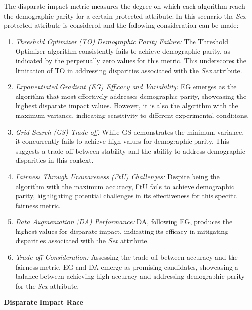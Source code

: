 The disparate impact metric measures the degree on which each algorithm reach the demographic parity for a certain protected attribute. In this scenario the \emph{Sex} protected attribute is considered and the following consideration can be made:

\begin{enumerate}
    \item \emph{Threshold Optimizer (TO) Demographic Parity Failure:} The Threshold Optimizer algorithm consistently fails to achieve demographic parity, as indicated by the perpetually zero values for this metric. This underscores the limitation of TO in addressing disparities associated with the \emph{Sex} attribute.

    \item \emph{Exponentiated Gradient (EG) Efficacy and Variability:} EG emerges as the algorithm that most effectively addresses demographic parity, showcasing the highest disparate impact values. However, it is also the algorithm with the maximum variance, indicating sensitivity to different experimental conditions.

    \item \emph{Grid Search (GS) Trade-off:} While GS demonstrates the minimum variance, it concurrently fails to achieve high values for demographic parity. This suggests a trade-off between stability and the ability to address demographic disparities in this context.

    \item \emph{Fairness Through Unawareness (FtU) Challenges:} Despite being the algorithm with the maximum accuracy, FtU fails to achieve demographic parity, highlighting potential challenges in its effectiveness for this specific fairness metric.

    \item \emph{Data Augmentation (DA) Performance:} DA, following EG, produces the highest values for disparate impact, indicating its efficacy in mitigating disparities associated with the \emph{Sex} attribute.

    \item \emph{Trade-off Consideration:} Assessing the trade-off between accuracy and the fairness metric, EG and DA emerge as promising candidates, showcasing a balance between achieving high accuracy and addressing demographic parity for the \emph{Sex} attribute.
\end{enumerate}
\newpage
\textbf{Disparate Impact Race}
